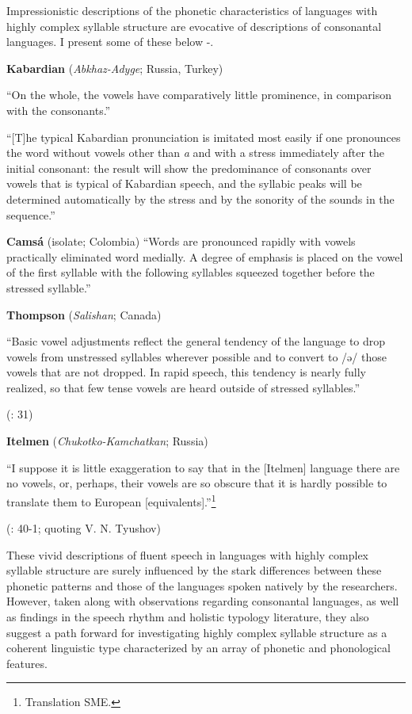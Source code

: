   Impressionistic descriptions of the phonetic characteristics of languages with highly complex syllable structure are evocative of descriptions of consonantal languages. I present some of these below -.

\ea\label{ex:1.19}
  \textbf{Kabardian} (\textit{Abkhaz-Adyge}; Russia, Turkey)

“On the whole, the vowels have comparatively little prominence, in comparison with the consonants.”
\citep[24]{Kuipers1960}

“[T]he typical Kabardian pronunciation is imitated most easily if one pronounces the word without vowels other than \textit{a} and with a stress immediately after the initial consonant: the result will show the predominance of consonants over vowels that is typical of Kabardian speech, and the syllabic peaks will be determined automatically by the stress and by the sonority of the sounds in the sequence.” 
\citep[43]{Kuipers1960}
\z

\ea\label{ex:1.20}
  \textbf{Camsá} (isolate; Colombia)
“Words are pronounced rapidly with vowels practically eliminated word medially. A degree of emphasis is placed on the vowel of the first syllable with the following syllables squeezed together before the stressed syllable.” 
\z
\citep[86-7]{Howard1967}

\ea\label{ex:1.21}
  \textbf{Thompson} (\textit{Salishan}; Canada)

“Basic vowel adjustments reflect the general tendency of the language to drop vowels from unstressed syllables wherever possible and to convert to /ə/ those vowels that are not dropped. In rapid speech, this tendency is nearly fully realized, so that few tense vowels are heard outside of stressed syllables.”

(\citealt{ThompsonThompson1992}: 31)
\z

\ea\label{ex:1.22}
  \textbf{Itelmen} (\textit{Chukotko-Kamchatkan}; Russia)

“I suppose it is little exaggeration to say that in the [Itelmen] language there are no vowels, or, perhaps, their vowels are so obscure that it is hardly possible to translate them to European [equivalents].”\footnote{{Translation SME.}}

(\citealt{Volodin1976}: 40-1; quoting V. N. Tyushov)
\z

  These vivid descriptions of fluent speech in languages with highly complex syllable structure are surely influenced by the stark differences between these phonetic patterns and those of the languages spoken natively by the researchers. However, taken along with observations regarding consonantal languages, as well as findings in the speech rhythm and holistic typology literature, they also suggest a path forward for investigating highly complex syllable structure as a coherent linguistic type characterized by an array of phonetic and phonological features.

